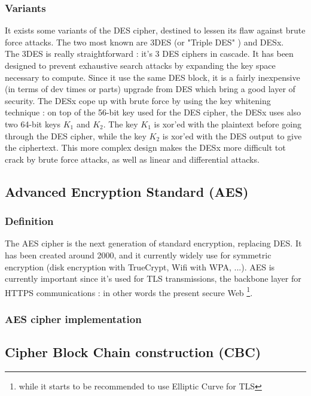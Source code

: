 \subsubsection{Variants}

It exists some variants of the DES cipher, destined to lessen its flaw against brute force attacks. The two most known are 3DES (or "Triple DES" ) and DESx. \\
The 3DES is really straightforward : it's 3 DES ciphers in cascade. It has been designed to prevent exhaustive search attacks by expanding the key space necessary to compute. Since it use the same DES block, it is a fairly inexpensive (in terms of dev times or parts) upgrade from DES which bring a good layer of security.
The DESx cope up with brute force by using the key whitening technique : on top of the 56-bit key used for the DES cipher, the DESx uses also two 64-bit keys $K_1$ and $K_2$. The key $K_1$ is xor'ed with the plaintext before going through the DES cipher, while the key $K_2$ is xor'ed with the DES output to give the ciphertext. This more complex design makes the DESx more difficult tot crack by brute force attacks, as well as linear and differential attacks.

\subsection{Advanced Encryption Standard (AES)}

\subsubsection{Definition}

The AES cipher is the next generation of standard encryption, replacing DES. It has been created around 2000, and it currently widely use for symmetric encryption (disk encryption with TrueCrypt, Wifi with WPA, ...). AES is currently important since it's used for TLS transmissions, the backbone layer for HTTPS communications : in other words the present secure Web \footnote{while it starts to be recommended to use Elliptic Curve for TLS}.

\subsubsection{ AES cipher implementation }


\subsection{Cipher Block Chain construction (CBC)}



